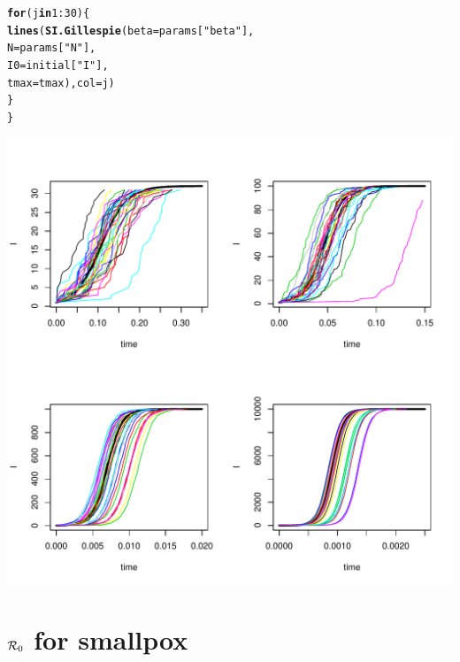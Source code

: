 \documentclass[12pt]{article}\usepackage[]{graphicx}\usepackage[]{color}
\makeatletter
\def\maxwidth{ %
  \ifdim\Gin@nat@width>\linewidth
    \linewidth
  \else
    \Gin@nat@width
  \fi
}
\newcommand{\hlnum}[1]{\textcolor[rgb]{0.686,0.059,0.569}{#1}}%
\newcommand{\hlstr}[1]{\textcolor[rgb]{0.192,0.494,0.8}{#1}}%
\newcommand{\hlopt}[1]{\textcolor[rgb]{0,0,0}{#1}}%
\newcommand{\hlstd}[1]{\textcolor[rgb]{0.345,0.345,0.345}{#1}}%
\newcommand{\hlkwa}[1]{\textcolor[rgb]{0.161,0.373,0.58}{\textbf{#1}}}%
\newcommand{\hlkwc}[1]{\textcolor[rgb]{0.333,0.667,0.333}{#1}}%
\newcommand{\hlkwd}[1]{\textcolor[rgb]{0.737,0.353,0.396}{\textbf{#1}}}%
\newenvironment{kframe}{%
 \def\at@end@of@kframe{}%
 \ifinner\ifhmode%
  \def\at@end@of@kframe{\end{minipage}}%
  \begin{minipage}{\columnwidth}%
 \fi\fi%
 \def\FrameCommand##1{\hskip\@totalleftmargin \hskip-\fboxsep
 \colorbox{shadecolor}{##1}\hskip-\fboxsep
     \hskip-\linewidth \hskip-\@totalleftmargin \hskip\columnwidth}%
 \MakeFramed {\advance\hsize-\width
   \@totalleftmargin\z@ \linewidth\hsize
   \@setminipage}}%
 {\par\unskip\endMakeFramed%
 \at@end@of@kframe}
\newenvironment{knitrout}{}{} %
\makeatother
\begin{document}
\begin{enumerate}[(a)]
\begin{knitrout}
\begin{kframe}
\begin{alltt}
  \hlkwa{for} \hlstd{(j} \hlkwa{in} \hlnum{1}\hlopt{:}\hlnum{30}\hlstd{)\{}
    \hlkwd{lines}\hlstd{(}\hlkwd{SI.Gillespie}\hlstd{(}\hlkwc{beta} \hlstd{= params[}\hlstr{"beta"}\hlstd{],}
                       \hlkwc{N} \hlstd{= params[}\hlstr{"N"}\hlstd{],}
                       \hlkwc{I0} \hlstd{= initial[}\hlstr{"I"}\hlstd{],}
                       \hlkwc{tmax} \hlstd{= tmax),} \hlkwc{col} \hlstd{= j)}
  \hlstd{\}}
\hlstd{\}}
\end{alltt}
\end{kframe}
\includegraphics[width=\maxwidth]{figure/unnamed-chunk-8-1} 

\end{knitrout}

\end{enumerate}

\section{${\cal R}_0$ for smallpox}

\Rintro
\end{document}
